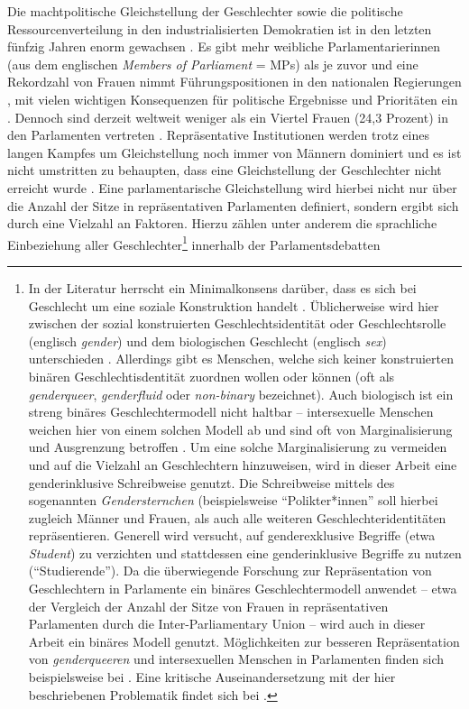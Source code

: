\documentclass[12pt, 
    twoside=false, 
    bibliography=totoc, 
    numbers=endperiod, 
    headings=normal, 
    toc=chapterentrydotfill
    ]{scrbook}
\begin{document}
\noindent
Die machtpolitische Gleichstellung der Geschlechter sowie die politische Ressourcenverteilung in den industrialisierten Demokratien ist in den letzten fünfzig Jahren enorm gewachsen \parencite[318]{coffe_2010}. Es gibt mehr weibliche Parlamentarierinnen (aus dem englischen \emph{Members of Parliament} = MPs) als je zuvor und eine Rekordzahl von Frauen nimmt Führungspositionen in den nationalen Regierungen \parencites{lovenduski_2005}{paxton_2007}, mit vielen wichtigen Konsequenzen für politische Ergebnisse und Prioritäten ein \parencites{bolzendahl_2007}{carroll_2001}{waring_2000}[318]{coffe_2010}. Dennoch sind derzeit weltweit weniger als ein Viertel Frauen (24,3 Prozent) in den Parlamenten vertreten \parencite{ipu_2019}. Repräsentative Institutionen werden trotz eines langen Kampfes um Gleichstellung noch immer von Männern dominiert \parencites[149]{celis_2018}[497 f.]{childs_2013}{dahlerup_2013} {bjarnegard_2013} und es ist nicht umstritten zu behaupten, dass eine Gleichstellung der Geschlechter nicht erreicht wurde \parencite[150]{celis_2018}. Eine parlamentarische Gleichstellung wird hierbei nicht nur über die Anzahl der Sitze in repräsentativen Parlamenten definiert, sondern ergibt sich durch eine Vielzahl an Faktoren. Hierzu zählen unter anderem die sprachliche Einbeziehung aller Geschlechter\footnote{In der Literatur herrscht ein Minimalkonsens darüber, dass es sich bei Geschlecht um eine soziale Konstruktion handelt \parencite[2]{meissner_2008}. Üblicherweise wird hier zwischen der sozial konstruierten Geschlechtsidentität oder Geschlechtsrolle (englisch \emph{gender}) und dem biologischen Geschlecht (englisch \emph{sex}) unterschieden \parencite[3f.]{meissner_2008}. Allerdings gibt es Menschen, welche sich keiner konstruierten binären Geschlechtisdentität zuordnen wollen oder können (oft als \emph{genderqueer}, \emph{genderfluid} oder \emph{non-binary} bezeichnet). Auch biologisch ist ein streng binäres Geschlechtermodell nicht haltbar -- intersexuelle Menschen weichen hier von einem solchen Modell ab und sind oft von Marginalisierung und Ausgrenzung betroffen \parencite[vgl.][]{richards_2016}. Um eine solche Marginalisierung zu vermeiden und auf die Vielzahl an Geschlechtern hinzuweisen, wird in dieser Arbeit eine genderinklusive Schreibweise genutzt. Die Schreibweise mittels des sogenannten \emph{Gendersternchen} (beispielsweise \enquote{Polikter*innen} soll hierbei zugleich Männer und Frauen, als auch alle weiteren Geschlechteridentitäten repräsentieren. Generell wird versucht, auf genderexklusive Begriffe (etwa \emph{Student}) zu verzichten und stattdessen eine genderinklusive Begriffe zu nutzen (\enquote{Studierende}). Da die überwiegende Forschung zur Repräsentation von Geschlechtern in Parlamente ein binäres Geschlechtermodell anwendet -- etwa der Vergleich der Anzahl der Sitze von Frauen in repräsentativen Parlamenten durch die Inter-Parliamentary Union \textcite{ipu_2019} -- wird auch in dieser Arbeit ein binäres Modell genutzt. Möglichkeiten zur besseren Repräsentation von \emph{genderqueeren} und intersexuellen Menschen in Parlamenten finden sich beispielsweise bei \textcite{squires_2008}. Eine kritische Auseinandersetzung mit der hier beschriebenen Problematik findet sich bei \parencite[6ff.]{meissner_2008}.} innerhalb der Parlamentsdebatten 
\end{document}

